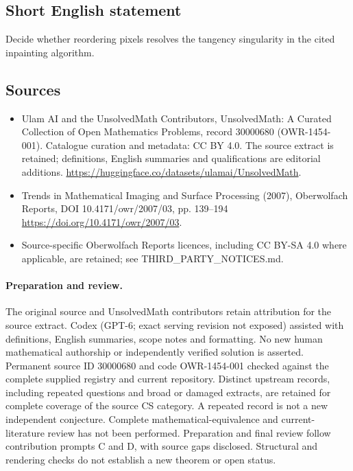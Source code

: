 \documentclass[11pt]{article}
\begin{document}
\subsection{Short English statement}
Decide whether reordering pixels resolves the tangency singularity in the cited inpainting algorithm.
\subsection{Sources}
\begin{itemize}
\item[\hypertarget{source:30000680:1}{S1}] Ulam AI and the UnsolvedMath Contributors, UnsolvedMath: A Curated Collection of Open Mathematics Problems, record 30000680 (OWR-1454-001). Catalogue curation and metadata: CC BY 4.0. The source extract is retained; definitions, English summaries and qualifications are editorial additions.
\url{https://huggingface.co/datasets/ulamai/UnsolvedMath}.
\item[\hypertarget{source:30000680:2}{S2}] Trends in Mathematical Imaging and Surface Processing (2007), Oberwolfach Reports, DOI 10.4171/owr/2007/03, pp. 139--194
\url{https://doi.org/10.4171/owr/2007/03}.
\item Source-specific Oberwolfach Reports licences, including CC BY-SA 4.0 where applicable, are retained; see THIRD\_PARTY\_NOTICES.md.
\end{itemize}
\paragraph{Preparation and review.}
The original source and UnsolvedMath contributors retain attribution for the source extract. Codex (GPT-6; exact serving revision not exposed) assisted with definitions, English summaries, scope notes and formatting. No new human mathematical authorship or independently verified solution is asserted. Permanent source ID 30000680 and code OWR-1454-001 checked against the complete supplied registry and current repository. Distinct upstream records, including repeated questions and broad or damaged extracts, are retained for complete coverage of the source CS category. A repeated record is not a new independent conjecture. Complete mathematical-equivalence and current-literature review has not been performed. Preparation and final review follow contribution prompts C and D, with source gaps disclosed. Structural and rendering checks do not establish a new theorem or open status.
\label{end:30000680}
\end{document}

